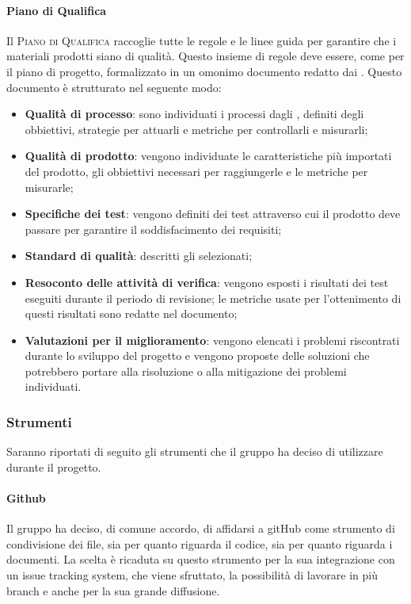 \documentclass[../norme_di_progetto.tex]{subfiles}
\begin{document}
\paragraph{Piano di Qualifica}
Il \textsc{Piano di Qualifica} raccoglie tutte le regole e le linee guida per garantire che i materiali prodotti siano di qualità. Questo insieme di regole deve essere, come per il piano di progetto, formalizzato in un omonimo documento redatto dai .
Questo documento è strutturato nel seguente modo:
\begin{itemize}
    \item \textbf{Qualità di processo}: sono individuati i processi dagli , definiti degli obbiettivi, strategie per attuarli e metriche per controllarli e misurarli;
    \item \textbf{Qualità di prodotto}: vengono individuate le caratteristiche più importati del prodotto, gli obbiettivi necessari per raggiungerle e le metriche per misurarle;
    \item \textbf{Specifiche dei test}: vengono definiti dei test attraverso cui il prodotto deve passare per garantire il soddisfacimento dei requisiti;
    \item \textbf{Standard di qualità}: descritti gli  selezionati;
    \item \textbf{Resoconto delle attività di verifica}: vengono esposti i risultati dei test eseguiti durante il periodo di revisione; le metriche usate per l'ottenimento di questi risultati sono redatte nel documento;
    \item \textbf{Valutazioni per il miglioramento}: vengono elencati i problemi riscontrati durante lo sviluppo del progetto e vengono proposte delle soluzioni che potrebbero portare alla risoluzione o alla mitigazione dei problemi individuati.
\end{itemize} 

\subsubsection{Strumenti}
Saranno riportati di seguito gli strumenti che il gruppo ha deciso di utilizzare durante il progetto.

\paragraph{Github}
Il gruppo ha deciso, di comune accordo, di affidarsi a gitHub come strumento di condivisione dei file, sia per quanto riguarda il codice, sia per quanto riguarda i documenti. La scelta è ricaduta su questo strumento per la sua integrazione con un issue tracking system, che viene sfruttato, la possibilità di lavorare in più branch e anche per la sua grande diffusione.
\end{document}
